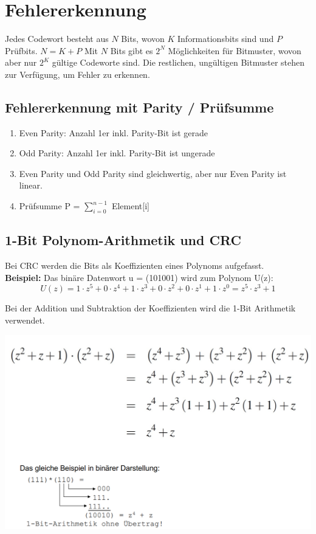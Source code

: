 \section{Fehlererkennung}%
\label{sec:fehlererkennung}

Jedes Codewort besteht aus $N$ Bits, wovon $K$ Informationsbits sind und $P$ Prüfbits. $N=K+P$ Mit $N$ Bits gibt es $2^N$ Möglichkeiten für Bitmuster, wovon aber nur $2^K$ gültige Codeworte sind. Die restlichen, ungültigen Bitmuster stehen zur Verfügung, um Fehler zu erkennen.

\subsection{Fehlererkennung mit Parity / Prüfsumme}%
\label{sub:fehlererkennung_mit_parity_prüfsumme}
\begin{enumerate}
    \item Even Parity: Anzahl 1er inkl. Parity-Bit ist gerade
    \item Odd Parity: Anzahl 1er inkl. Parity-Bit ist ungerade
    \item Even Parity und Odd Parity sind gleichwertig, aber nur Even Parity ist linear.
    \item Prüfsumme P = $\sum^{n-1}_{i=0}$ Element[i]
\end{enumerate}

\subsection{1-Bit Polynom-Arithmetik und CRC}%
Bei CRC werden die Bits als Koeffizienten eines Polynoms aufgefasst. \\
\textbf{Beispiel: } Das binäre Datenwort u = (101001) wird zum Polynom U(z):
\[
    U(z) = 1 \cdot z^5 + 0 \cdot z^4 + 1 \cdot z^3 + 0 \cdot z^2 + 0 \cdot z^1 + 1 \cdot z^0 = z^5 \cdot z^3 + 1
\]

Bei der Addition und Subtraktion der Koeffizienten wird die 1-Bit Arithmetik verwendet.

\begin{center}
    \includegraphics[width=1\linewidth]{images/crcm.png}
\end{center}

